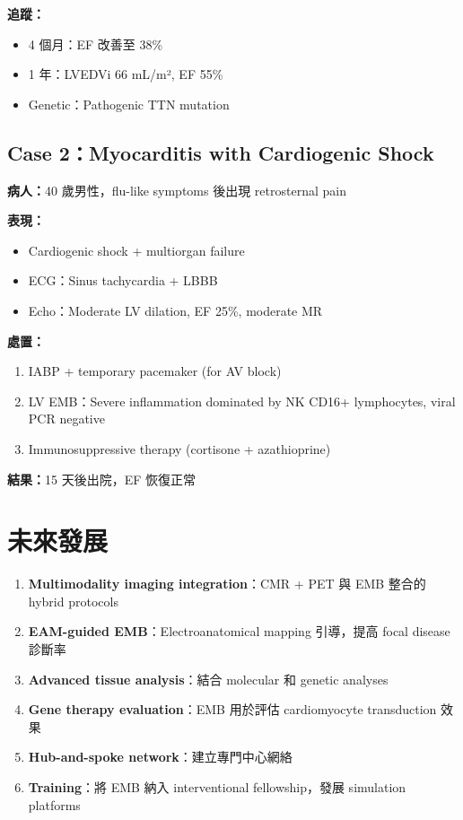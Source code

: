 \documentclass[12pt,a4paper]{article}
\begin{document}
\textbf{追蹤：}
\begin{itemize}
    \item 4 個月：EF 改善至 38\%
    \item 1 年：LVEDVi 66 mL/m², EF 55\%
    \item Genetic：Pathogenic TTN mutation
\end{itemize}

\subsection{Case 2：Myocarditis with Cardiogenic Shock}

\textbf{病人：}40 歲男性，flu-like symptoms 後出現 retrosternal pain

\textbf{表現：}
\begin{itemize}
    \item Cardiogenic shock + multiorgan failure
    \item ECG：Sinus tachycardia + LBBB
    \item Echo：Moderate LV dilation, EF 25\%, moderate MR
\end{itemize}

\textbf{處置：}
\begin{enumerate}
    \item IABP + temporary pacemaker (for AV block)
    \item LV EMB：Severe inflammation dominated by NK CD16+ lymphocytes, viral PCR negative
    \item Immunosuppressive therapy (cortisone + azathioprine)
\end{enumerate}

\textbf{結果：}15 天後出院，EF 恢復正常

\section{未來發展}

\begin{enumerate}
    \item \textbf{Multimodality imaging integration}：CMR + PET 與 EMB 整合的 hybrid protocols
    \item \textbf{EAM-guided EMB}：Electroanatomical mapping 引導，提高 focal disease 診斷率
    \item \textbf{Advanced tissue analysis}：結合 molecular 和 genetic analyses
    \item \textbf{Gene therapy evaluation}：EMB 用於評估 cardiomyocyte transduction 效果
    \item \textbf{Hub-and-spoke network}：建立專門中心網絡
    \item \textbf{Training}：將 EMB 納入 interventional fellowship，發展 simulation platforms
\end{enumerate}
\end{document}
